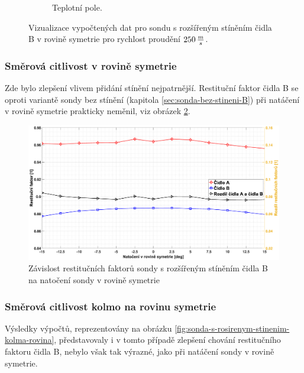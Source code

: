 \begin{figure}[ht!]
\begin{subfigure}{0.45\textwidth}
                    \caption{Teplotní pole.}
                \end{subfigure}
                \caption{Vizualizace vypočtených dat pro sondu s rozšířeným stíněním čidla B v rovině symetrie pro rychlost proudění $250 \, \frac{m}{s}$.}
                \label{fig:sonda-s-rozsirenym-stinenim-B-vizualizace}
            \end{figure}
        \subsubsection{Směrová citlivost v rovině symetrie}
            Zde bylo zlepšení vlivem přidání stínění nejpatrnější. Restituční faktor čidla B se oproti variantě sondy bez stínění (kapitola \ref{sec:sonda-bez-stineni-B}) při natáčení v rovině symetrie prakticky neměnil, viz obrázek \ref{fig:sonda-s-rosirenym-stinenim-rovina-symetrie}.
            
            \begin{figure}[ht!]
                \centering
                \includegraphics*[width=\textwidth, trim={5.9cm 1.0cm 2.7cm 2.0cm}]{400_SIMULACE_KONSTRUKCNICH_UPRAV/Grafy/03_rovina_symetrie}
                \caption{Závislost restitučních faktorů sondy s rozšířeným stíněním čidla B na natočení sondy v rovině symetrie}
                \label{fig:sonda-s-rosirenym-stinenim-rovina-symetrie}
            \end{figure}
        \subsubsection{Směrová citlivost kolmo na rovinu symetrie}
            Výsledky výpočtů, reprezentovány na obrázku \ref{fig:sonda-s-rosirenym-stinenim-kolma-rovina}, představovaly i v tomto případě zlepšení chování restitučního faktoru čidla B, nebylo však tak výrazné, jako při natáčení sondy v rovině symetrie.
            
